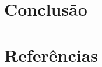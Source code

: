 \begin{document}

\section{Conclusão} \label{sec:conclusao}


\section{Referências}



\end{document}
